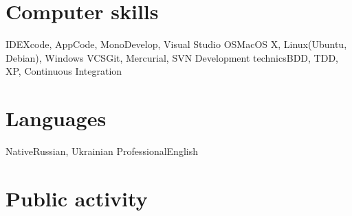 \documentclass[11pt,a4paper]{moderncv}
\begin{document}
\section{Computer skills}
  \cvline
  {IDE}{Xcode, AppCode, MonoDevelop, Visual Studio}
  \cvline
  {OS}{MacOS X, Linux(Ubuntu, Debian), Windows}
  \cvline
  {VCS}{Git, Mercurial, SVN}
  \cvline
  {Development technics}{BDD, TDD, XP, Continuous Integration}
    
\section{Languages}
 \cvline
  {Native}{Russian, Ukrainian}
\cvline
  {Professional}{English}

\section{Public activity}
\end{document}

